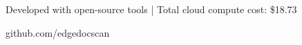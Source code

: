 \documentclass[11pt,a4paper]{article}
\begin{document}
\vspace{1cm}

\begin{center}
    
    \vspace{0.3cm}
    
    {\small\color{darkgray} Developed with open-source tools | Total cloud compute cost: \$18.73}
    
    \vspace{0.2cm}
    
    {\small\color{darkgray}\faGithub\hspace{0.3em}github.com/edgedocscan}
\end{center}
\end{document}

